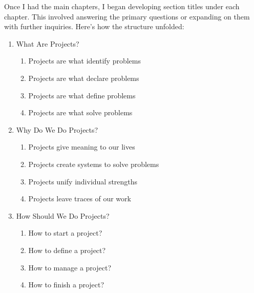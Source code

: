 \documentclass[a4paper]{article}
\begin{document}
Once I had the main chapters, I began developing section titles under each chapter. 
This involved answering the primary questions or expanding on them with further inquiries. 
Here's how the structure unfolded:

\begin{enumerate}
    \item What Are Projects?
    \begin{enumerate}
        \item Projects are what identify problems  
        \item Projects are what declare problems  
        \item Projects are what define problems  
        \item Projects are what solve problems  
    \end{enumerate}
    \item Why Do We Do Projects?
    \begin{enumerate}
        \item Projects give meaning to our lives  
        \item Projects create systems to solve problems  
        \item Projects unify individual strengths  
        \item Projects leave traces of our work  
    \end{enumerate}
    \item How Should We Do Projects?
    \begin{enumerate}
        \item How to start a project?  
        \item How to define a project?  
        \item How to manage a project?  
        \item How to finish a project?  
    \end{enumerate}
\end{enumerate}
\end{document}
